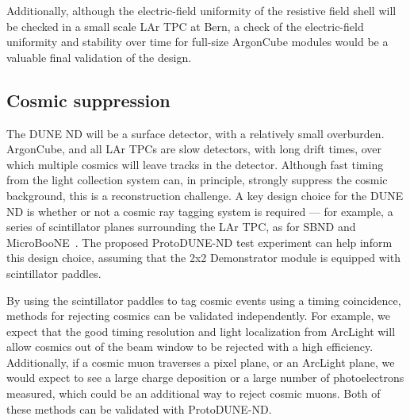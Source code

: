 Additionally, although the electric-field uniformity of the resistive field shell will be checked in a small scale LAr TPC at Bern, a check of the electric-field uniformity and stability over time for full-size ArgonCube modules would be a valuable final validation of the design.

\subsection{Cosmic suppression}

The DUNE ND will be a surface detector, with a relatively small overburden. ArgonCube, and all LAr TPCs are slow detectors, with long drift times, over which multiple cosmics will leave tracks in the detector. Although fast timing from the light collection system can, in principle, strongly suppress the cosmic background, this is a reconstruction challenge. A key design choice for the DUNE ND is whether or not a cosmic ray tagging system is required --- for example, a series of scintillator planes surrounding the LAr TPC, as for SBND and MicroBooNE~\addcite. The proposed ProtoDUNE-ND test experiment can help inform this design choice, assuming that the 2x2 Demonstrator module is equipped with scintillator paddles.

By using the scintillator paddles to tag cosmic events using a timing coincidence, methods for rejecting cosmics can be validated independently. For example, we expect that the good timing resolution and light localization from ArcLight will allow cosmics out of the beam window to be rejected with a high efficiency. Additionally, if a cosmic muon traverses a pixel plane, or an ArcLight plane, we would expect to see a large charge deposition or a large number of photoelectrons measured, which could be an additional way to reject cosmic muons. Both of these methods can be validated with ProtoDUNE-ND.

